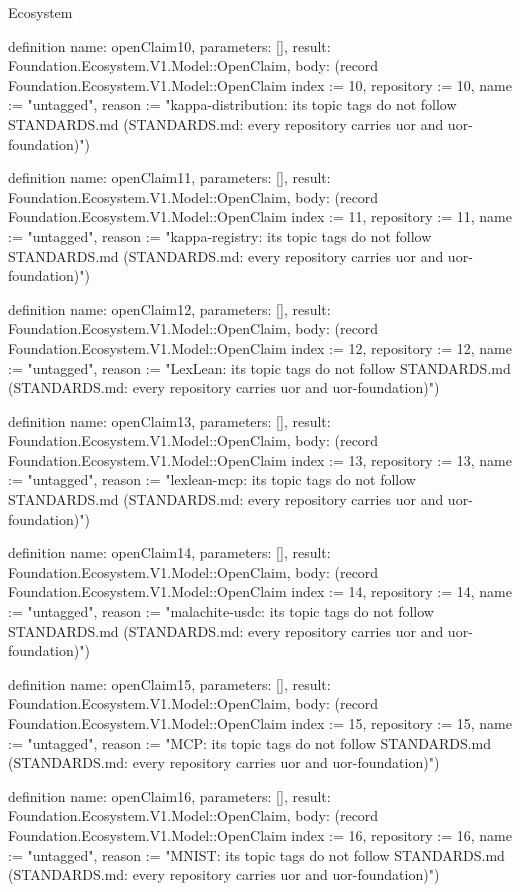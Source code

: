 \begin{lexlean}{Ecosystem}
\begin{semanticmodule}
definition{
  name: openClaim10,
  parameters: [],
  result: Foundation.Ecosystem.V1.Model::OpenClaim,
  body: (record Foundation.Ecosystem.V1.Model::OpenClaim {index := 10, repository := 10, name := "untagged", reason := "kappa-distribution: its topic tags do not follow STANDARDS.md (STANDARDS.md: every repository carries uor and uor-foundation)"})
}

definition{
  name: openClaim11,
  parameters: [],
  result: Foundation.Ecosystem.V1.Model::OpenClaim,
  body: (record Foundation.Ecosystem.V1.Model::OpenClaim {index := 11, repository := 11, name := "untagged", reason := "kappa-registry: its topic tags do not follow STANDARDS.md (STANDARDS.md: every repository carries uor and uor-foundation)"})
}

definition{
  name: openClaim12,
  parameters: [],
  result: Foundation.Ecosystem.V1.Model::OpenClaim,
  body: (record Foundation.Ecosystem.V1.Model::OpenClaim {index := 12, repository := 12, name := "untagged", reason := "LexLean: its topic tags do not follow STANDARDS.md (STANDARDS.md: every repository carries uor and uor-foundation)"})
}

definition{
  name: openClaim13,
  parameters: [],
  result: Foundation.Ecosystem.V1.Model::OpenClaim,
  body: (record Foundation.Ecosystem.V1.Model::OpenClaim {index := 13, repository := 13, name := "untagged", reason := "lexlean-mcp: its topic tags do not follow STANDARDS.md (STANDARDS.md: every repository carries uor and uor-foundation)"})
}

definition{
  name: openClaim14,
  parameters: [],
  result: Foundation.Ecosystem.V1.Model::OpenClaim,
  body: (record Foundation.Ecosystem.V1.Model::OpenClaim {index := 14, repository := 14, name := "untagged", reason := "malachite-usdc: its topic tags do not follow STANDARDS.md (STANDARDS.md: every repository carries uor and uor-foundation)"})
}

definition{
  name: openClaim15,
  parameters: [],
  result: Foundation.Ecosystem.V1.Model::OpenClaim,
  body: (record Foundation.Ecosystem.V1.Model::OpenClaim {index := 15, repository := 15, name := "untagged", reason := "MCP: its topic tags do not follow STANDARDS.md (STANDARDS.md: every repository carries uor and uor-foundation)"})
}

definition{
  name: openClaim16,
  parameters: [],
  result: Foundation.Ecosystem.V1.Model::OpenClaim,
  body: (record Foundation.Ecosystem.V1.Model::OpenClaim {index := 16, repository := 16, name := "untagged", reason := "MNIST: its topic tags do not follow STANDARDS.md (STANDARDS.md: every repository carries uor and uor-foundation)"})
}


\end{semanticmodule}
\end{lexlean}
